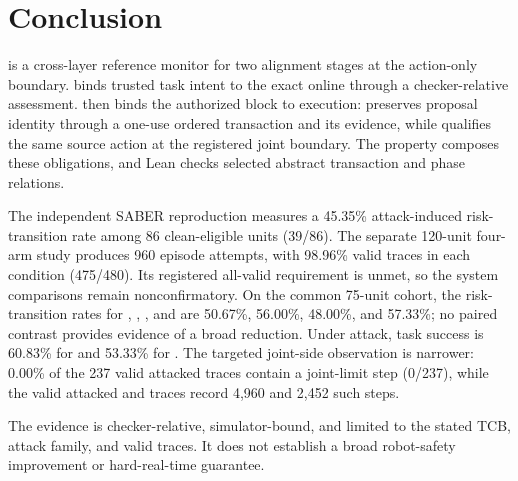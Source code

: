 \section{Conclusion}

\system is a cross-layer reference monitor for two alignment stages at the
action-only \vla boundary.  \lone binds trusted task intent to the exact online
\actionblock through a checker-relative assessment.  \ltwo then binds the
authorized block to execution: \ltwoa preserves proposal identity through a
one-use ordered transaction and its evidence, while \ltwob qualifies the same
source action at the registered joint boundary.  The
\proofaligned property composes these obligations, and Lean checks
selected abstract transaction and phase relations.

The independent SABER reproduction measures a 45.35\% attack-induced
risk-transition rate among 86 clean-eligible units (39/86).  The separate
120-unit four-arm study produces 960 episode attempts, with 98.96\% valid traces
in each condition (475/480).  Its registered all-valid requirement is unmet, so
the system comparisons remain nonconfirmatory.  On the common 75-unit cohort,
the risk-transition rates for \vlaonly, \loneonly, \ltwoonly, and \dual are
50.67\%, 56.00\%, 48.00\%, and 57.33\%; no paired contrast provides evidence of
a broad reduction.  Under attack, task success is 60.83\% for \vlaonly and
53.33\% for \dual.  The targeted joint-side observation is narrower: 0.00\%
of the 237 valid attacked \ltwoenabled traces contain a joint-limit step (0/237), while
the valid attacked \vlaonly and \loneonly traces record 4,960 and 2,452 such
steps.

The evidence is checker-relative, simulator-bound, and limited to the stated
TCB, attack family, and valid traces.  It does not establish a broad
robot-safety improvement or hard-real-time guarantee.
